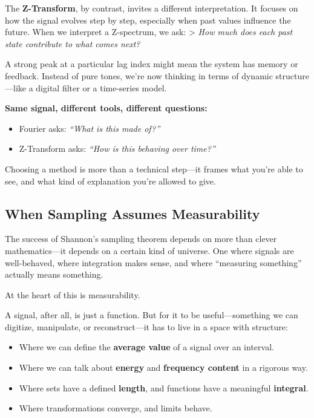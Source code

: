 The \textbf{Z-Transform}, by contrast, invites a different interpretation. It focuses on how the signal evolves step by step, especially when past values influence the future. When we interpret a Z-spectrum, we ask:  
> \textit{How much does each past state contribute to what comes next?}

A strong peak at a particular lag index might mean the system has memory or feedback. Instead of pure tones, we’re now thinking in terms of dynamic structure—like a digital filter or a time-series model.

\medskip

\noindent
\textbf{Same signal, different tools, different questions:}

\begin{itemize}
  \item Fourier asks: \textit{“What is this made of?”}
  \item Z-Transform asks: \textit{“How is this behaving over time?”}
\end{itemize}

Choosing a method is more than a technical step—it frames what you’re able to see, and what kind of explanation you’re allowed to give.



\subsection{When Sampling Assumes Measurability}

The success of Shannon’s sampling theorem depends on more than clever mathematics—it depends on a certain kind of universe. One where signals are well-behaved, where integration makes sense, and where “measuring something” actually means something.

At the heart of this is measurability.

A signal, after all, is just a function. But for it to be useful—something we can digitize, manipulate, or reconstruct—it has to live in a space with structure:

\begin{itemize}
  \item Where we can define the \textbf{average value} of a signal over an interval.
  \item Where we can talk about \textbf{energy} and \textbf{frequency content} in a rigorous way.
  \item Where sets have a defined \textbf{length}, and functions have a meaningful \textbf{integral}.
  \item Where transformations converge, and limits behave.
\end{itemize}

